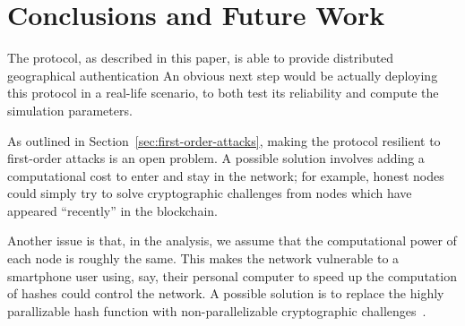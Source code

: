 \section{Conclusions and Future Work}


The protocol, as described in this paper,
is able to provide distributed geographical authentication
An obvious next step would be actually deploying this protocol in a real-life scenario,
to both test its reliability and compute the simulation parameters.

As outlined in Section~\ref{sec:first-order-attacks},
making the protocol resilient to first-order attacks is an open problem.
A possible solution involves adding a computational cost
to enter and stay in the network;
for example,
honest nodes could simply try to solve cryptographic challenges
from nodes which have appeared ``recently'' in the blockchain.

Another issue is that,
in the analysis,
we assume that the computational power of each node
is roughly the same.
This makes the network vulnerable to a smartphone user using,
say,
their personal computer to speed up the computation of hashes
could control the network.
A possible solution is to replace the highly parallizable hash function
with non-parallelizable cryptographic challenges~\cite{Tritilanunt2007}.
